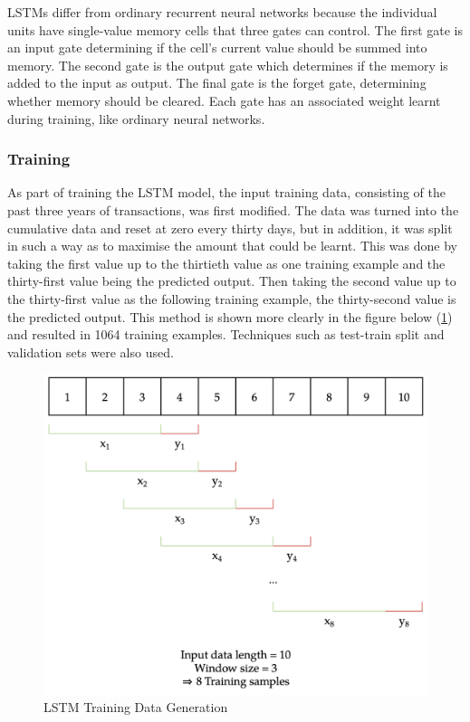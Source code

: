 LSTMs differ from ordinary recurrent neural networks because the individual units have single-value memory cells that three gates can control. The first gate is an input gate determining if the cell's current value should be summed into memory. The second gate is the output gate which determines if the memory is added to the input as output. The final gate is the forget gate, determining whether memory should be cleared. Each gate has an associated weight learnt during training, like ordinary neural networks.

\subsubsection{Training}
As part of training the LSTM model, the input training data, consisting of the past three years of transactions, was first modified. The data was turned into the cumulative data and reset at zero every thirty days, but in addition, it was split in such a way as to maximise the amount that could be learnt. This was done by taking the first value up to the thirtieth value as one training example and the thirty-first value being the predicted output. Then taking the second value up to the thirty-first value as the following training example, the thirty-second value is the predicted output. This method is shown more clearly in the figure below (\ref{fig:TrainingData}) and resulted in 1064 training examples. Techniques such as test-train split and validation sets were also used.

\begin{figure}[H]
	\centering
	\includegraphics[width=\textwidth]{images/rnn_sample_generation.png}
	\caption{LSTM Training Data Generation}
	\label{fig:TrainingData}
\end{figure}

